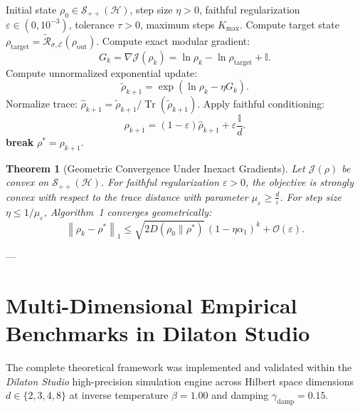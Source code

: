 \documentclass[11pt,a4paper]{article}
\theoremstyle{plain}
\newtheorem{theorem}{Theorem}[section]
\theoremstyle{definition}
\DeclareMathOperator{\Tr}{Tr}
\newcommand{\norm}[1]{\left\lVert #1 \right\rVert}
\newcommand{\TrDist}[2]{\frac{1}{2}\norm{#1 - #2}_1}
\begin{document}
\begin{algorithm}[H]
\caption{Faithful Relative-Entropy Quantum Mirror Descent}
\begin{algorithmic}[1]
\Require Initial state $\rho_0 \in \mathcal{S}_{++}(\mathcal{H})$, step size $\eta > 0$, faithful regularization $\varepsilon \in (0, 10^{-3})$, tolerance $\tau > 0$, maximum steps $K_{\max}$.
\State Compute target state $\rho_{\mathrm{target}} = \widetilde{\mathcal{R}}_{\sigma, \mathcal{E}}(\rho_{\mathrm{out}})$.
    \State Compute exact modular gradient:
    \begin{equation}
    G_k = \nabla \mathcal{J}(\rho_k) = \ln\rho_k - \ln\rho_{\mathrm{target}} + \mathbb{I}.
    \end{equation}
    \State Compute unnormalized exponential update:
    \begin{equation}
    \tilde{\rho}_{k+1} = \exp\left( \ln\rho_k - \eta G_k \right).
    \end{equation}
    \State Normalize trace: $\hat{\rho}_{k+1} = \tilde{\rho}_{k+1} / \Tr(\tilde{\rho}_{k+1})$.
    \State Apply faithful conditioning:
    \begin{equation}
    \rho_{k+1} = (1 - \varepsilon)\hat{\rho}_{k+1} + \varepsilon \frac{\mathbb{I}}{d}.
    \end{equation}
    \If{$\TrDist{\rho_{k+1}}{\rho_k} < \tau$ \textbf{or} $\norm{G_k}_F < \tau$}
        \State \textbf{break}
    \EndIf
\EndFor
\State \Return $\rho^* = \rho_{k+1}$.
\end{algorithmic}
\end{algorithm}

\begin{theorem}[Geometric Convergence Under Inexact Gradients]
Let $\mathcal{J}(\rho)$ be convex on $\mathcal{S}_{++}(\mathcal{H})$. For faithful regularization $\varepsilon > 0$, the objective is strongly convex with respect to the trace distance with parameter $\mu_\varepsilon \ge \frac{d}{\varepsilon}$. For step size $\eta \le 1/\mu_\varepsilon$, Algorithm~1 converges geometrically:
\begin{equation}
\norm{\rho_k - \rho^*}_1 \le \sqrt{2 D(\rho_0 \parallel \rho^*)} \, (1 - \eta \alpha_1)^k + \mathcal{O}(\varepsilon).
\end{equation}
\end{theorem}

---

\section{Multi-Dimensional Empirical Benchmarks in Dilaton Studio}
The complete theoretical framework was implemented and validated within the \textit{Dilaton Studio} high-precision simulation engine across Hilbert space dimensions $d \in \{2, 3, 4, 8\}$ at inverse temperature $\beta = 1.00$ and damping $\gamma_{\mathrm{damp}} = 0.15$.
\end{document}
